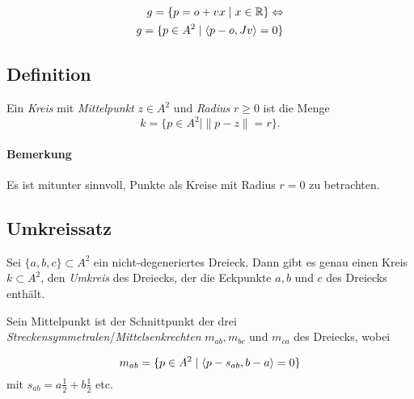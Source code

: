 	\begin{minipage}[t]{0.5\linewidth}
	 \vspace{1.5cm}
   		\begin{align*}
		    g = \{p = o + vx\mid x\in \mathbb{R}\} \Leftrightarrow \\
		    g = \{p\in A^2\mid \langle p-o,Jv \rangle = 0\} 
		\end{align*} 
    \end{minipage}
    \hfill
    \begin{minipage}[t]{0.45\linewidth}
     	\begin{figure}[H]\centering
     		
    	\end{figure}
    \end{minipage}	

\subsection{Definition}
\begin{Definition}
    Ein \emph{Kreis} mit \emph{Mittelpunkt} $ z\in A^2 $ und \emph{Radius} $ r\geq 0 $ ist die Menge
		\[ k = \{p\in A^2\mid \|p-z\| = r\}. \]
\end{Definition}
\paragraph{Bemerkung}
	Es ist mitunter sinnvoll, Punkte als Kreise mit Radius $ r=0 $ zu betrachten.
	
\subsection{Umkreissatz}
\begin{Satz}[Umkreissatz]
	Sei $ \{a,b,c\} \subset A^2 $ ein nicht-degeneriertes Dreieck. Dann gibt es genau einen Kreis $ k\subset A^2 $, den \emph{Umkreis} des Dreiecks, der die Eckpunkte $ a,b $ und $ c $ des Dreiecks enthält.
\end{Satz}	
	Sein Mittelpunkt ist der Schnittpunkt der drei \emph{Streckensymmetralen}/\emph{Mittelsenkrechten} $ m_{ab}, m_{bc}$ und $ m_{ca} $ des Dreiecks, wobei

    \begin{minipage}[t]{0.41\linewidth}
        \vspace{2cm}
    		\[ m_{ab} = \{p\in A^2\mid \langle p-s_{ab},b-a \rangle = 0\} \]
    	mit $ s_{ab} = a\frac{1}{2}+b\frac{1}{2} $ etc.
    	
    \end{minipage}
    \hfill
    \begin{minipage}[t]{0.58\linewidth}
     	\begin{figure}[H]\centering
     		
    	\end{figure}
    \end{minipage}		
	

